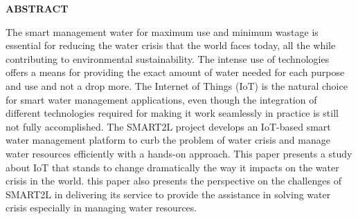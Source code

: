 \documentclass[12pt,times,a4paper]{report}
\renewcommand{\baselinestretch}{1.5}
\begin{document}






\newpage













\newpage
\renewcommand{\baselinestretch}{1.5}

\begin{center}
{\fontsize{14}{12} \bf ABSTRACT}\\

\begin{enumerate}
\begin{normalsize}
\vspace{0.4in}
              The smart management water for maximum use and minimum wastage is essential for reducing the water crisis that the world faces today, all the while contributing to environmental sustainability. The intense use of technologies offers a means for providing the exact amount of water needed for each purpose and use and not a drop more. 
The Internet of Things (IoT) is the natural choice for smart water management applications, even though the integration of different technologies required for making it work seamlessly in practice is still not fully accomplished. The SMART2L project develops an IoT-based smart water management platform to curb the problem of water crisis and manage water resources efficiently with a hands-on approach. 
This paper presents a study about IoT that stands to change dramatically the way it impacts on the water crisis in the world. this paper also presents the perspective on the challenges of SMART2L in delivering its service to provide the assistance in solving water crisis especially in managing water resources.
\\

\end{normalsize}
\end{enumerate}
\end{center}
\end{document}
